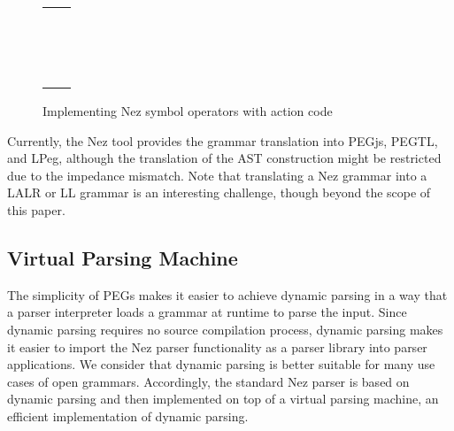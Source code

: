 \documentclass[preprint]{sigplanconf}
\begin{document}
{{{\begin{figure}[tb]
\begin{small}
\begin{tabular}{ll}
 &  \\
 &   \\
&   \\

 &
 \\

 &
 \\
 &  \\
 &  \\

 &
 \\
 &  \\
 &  \\

 &
 \\

 &
 \\

 &
 \\

 &
 \\

 &
 \\

\end{tabular}
\end{small}

\caption{Implementing Nez symbol operators with action code}
\label{fig:action}
\end{figure}

Currently, the Nez tool provides the grammar translation into PEGjs, PEGTL, and LPeg, although the translation of the AST construction might be restricted due to the impedance mismatch. Note that translating a Nez grammar into a LALR or LL grammar is an interesting challenge, though beyond the scope of this paper.

\subsection{Virtual Parsing Machine}

The simplicity of PEGs makes it easier to achieve dynamic parsing in a way that a parser interpreter loads a grammar  at runtime to parse the input. Since dynamic parsing requires no source compilation process, dynamic parsing makes it easier to import the Nez parser functionality as a parser library into parser applications. We consider that dynamic parsing is better suitable for many use cases of open grammars. Accordingly, the standard Nez parser is based on dynamic parsing and then implemented on top of a virtual parsing machine, an efficient implementation of dynamic parsing. 

}}}
\end{document}
